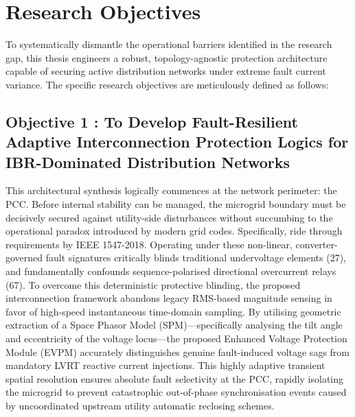 \section{Research Objectives}

To systematically dismantle the operational barriers identified in the research gap, this thesis engineers a robust, topology-agnostic protection architecture capable of securing active distribution networks under extreme fault current variance. 
The specific research objectives are meticulously defined as follows:
 
\subsection{Objective 1 : To Develop Fault-Resilient Adaptive Interconnection Protection Logics for IBR-Dominated Distribution Networks}
This architectural synthesis logically commences at the network perimeter: the PCC. Before internal stability can be managed, the microgrid boundary must be decisively secured against utility-side disturbances without succumbing to the operational paradox introduced by modern grid codes. Specifically, ride through requirements by IEEE 1547-2018. Operating under these non-linear, converter-governed fault signatures critically blinds traditional undervoltage elements (27), and fundamentally confounds sequence-polarised directional overcurrent relays (67). To overcome this deterministic protective blinding, the proposed interconnection framework abandons legacy RMS-based magnitude sensing in favor of high-speed instantaneous time-domain sampling. By utilising geometric extraction of a Space Phasor Model (SPM)—specifically analysing the tilt angle and eccentricity of the voltage locus—the proposed Enhanced Voltage Protection Module (EVPM) accurately distinguishes genuine fault-induced voltage sags from mandatory LVRT reactive current injections. This highly adaptive transient spatial resolution ensures absolute fault selectivity at the PCC, rapidly isolating the microgrid to prevent catastrophic out-of-phase synchronisation events caused by uncoordinated upstream utility automatic reclosing schemes.

